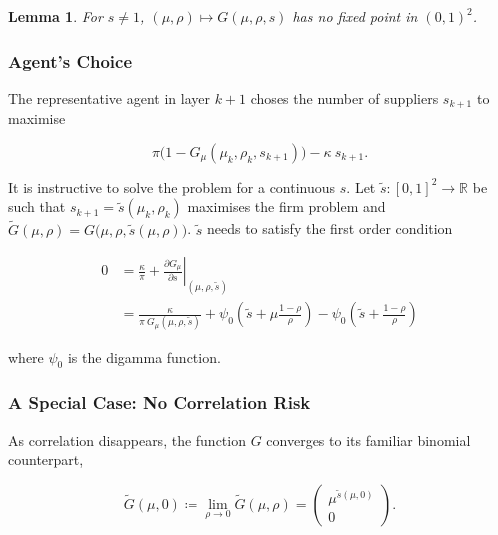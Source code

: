 \documentclass[american, abstract=on]{scrartcl}
\theoremstyle{plain}
\newtheorem{lemma}{Lemma}
\renewcommand{\Re}{\mathbb{R}}
\begin{document}
\begin{lemma}
  For $s \neq 1$, $(\mu, \rho) \mapsto G(\mu, \rho, s)$ has no fixed point in $(0, 1)^2$.
\end{lemma}

\subsubsection{Agent's Choice}

The representative agent in layer $k + 1$ choses the number of suppliers $s_{k+1}$ to maximise

\begin{equation}
  \pi \Big(1 - G_{\mu}(\mu_k, \rho_k, s_{k+1})\Big) - \kappa \  s_{k + 1}.
\end{equation}

It is instructive to solve the problem for a continuous $s$. Let $\tilde{s}: [0, 1]^2 \to \Re$ be such that $s_{k + 1} = \tilde{s}(\mu_k, \rho_k)$ maximises the firm problem and $\tilde{G}(\mu, \rho) = G\big(\mu, \rho, \tilde{s}(\mu, \rho)\big)$. $\tilde{s}$ needs to satisfy the first order condition

\begin{equation}
  \begin{split}
    0 &= \frac{\kappa}{\pi} + \left. \frac{\partial G_\mu}{\partial s} \right\vert_{(\mu, \rho, \tilde{s})}  \\
    &= \frac{\kappa}{\pi \ G_\mu(\mu, \rho, \tilde{s})} + \psi_0\left(\tilde{s} + \mu \frac{1 - \rho}{\rho} \right) - \psi_0\left(\tilde{s} + \frac{1 - \rho}{\rho} \right)  
  \end{split}
\end{equation}

where $\psi_0$ is the digamma function.

\subsubsection{A Special Case: No Correlation Risk}

As correlation disappears, the function $G$ converges to its familiar binomial counterpart,

\begin{equation}
  \tilde{G}(\mu, 0) \coloneqq \lim_{\rho \rightarrow 0} \tilde{G}(\mu, \rho) = \begin{pmatrix} \mu^{\tilde{s}(\mu, 0)} \\ 0 \end{pmatrix}.
\end{equation}
\end{document}
